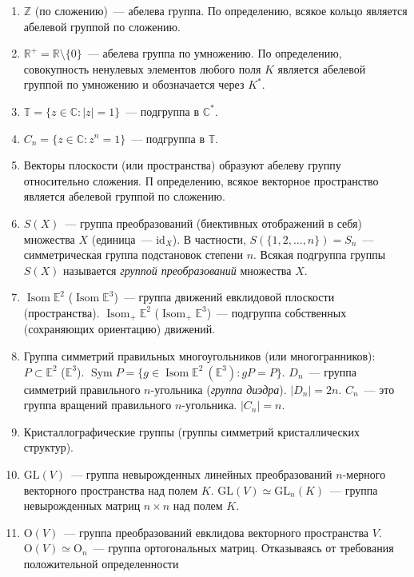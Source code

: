 \documentclass[a4paper]{article}
\newcommand{\Isom}{\mathop{\mathrm{Isom}}\nolimits}
\newcommand{\Sym}{\mathop{\mathrm{Sym}}\nolimits}
\begin{document}
\prim
\begin{enumerate}
  \item $\mathbb{Z}$ (по сложению)~--- абелева группа. По определению,
  всякое кольцо является абелевой группой по сложению.
  \item $\mathbb{R}^+=\mathbb{R}\setminus \{0\}$~--- абелева группа по
  умножению. По определению, совокупность ненулевых элементов любого
  поля $K$ является абелевой группой по умножению и обозначается
  через $K^*$.
  \item $\mathbb{T}=\{z\in\mathbb{C}: |z|=1\}$~--- подгруппа в
  $\mathbb{C}^*$.
  \item $C_n=\{z\in\mathbb{C}: z^n=1\}$~--- подгруппа в
  $\mathbb{T}$.
  \item Векторы плоскости (или пространства) образуют абелеву группу
  относительно сложения. П определению, всякое векторное
  простра\-нство является абелевой группой по сложению.
  \item $S(X)$~--- группа преобразований (биективных отображений в
  себя) множества $X$ (единица~--- $\mathrm{id}_X$). В частности, $S(\{1,2,\ldots,
  n\})=S_n$~--- симметрическая группа подстановок степени $n$.
  Всякая подгруппа группы $S(X)$ называется \emph{группой
  преобразований} множества $X$.
  \item $\Isom \mathbb{E}^2$ ($\Isom\mathbb{E}^3$)~--- группа движений
  евклидовой плоскости (пространства). $\Isom_+ \mathbb{E}^2$
  ($\Isom_+\mathbb{E}^3$)~--- подгруппа собственных (сохраняющих ориентацию)
  движений.
  \item Группа симметрий правильных многоугольников
  (или многогранников): $P\subset \mathbb{E}^2$ ($\mathbb{E}^3$). $\Sym P=
  \{g\in\Isom \mathbb{E}^2 \: (\mathbb{E}^3): gP=P\}$. $D_n$~---
  группа симметрий правильного $n$-угольника (\emph{группа диэдра}).
  $|D_n|=2n$. $C_n$~--- это группа вращений правильного
  $n$-угольника. $|C_n|=n$.
  \item Кристаллографические группы (группы симметрий кристаллических
  структур).
  \item $\mathrm{\mathrm{GL}}(V)$~--- группа невырожденных линейных преобразований
  $n$-мер\-ного векторного пространства над полем $K$. $\mathrm{\mathrm{GL}}(V)\simeq
  \mathrm{\mathrm{GL}}_n(K)$~--- группа невырожденных матриц $n\times n$ над полем
  $K$.
  \item $\mathrm{O}(V)$~--- группа преобразований евклидова векторного
  пространства $V$. $\mathrm{O}(V)\simeq \mathrm{O}_n$~--- группа ортогональных
  матриц. Отказываясь от требования положительной определенности

\end{enumerate}
\end{document}
